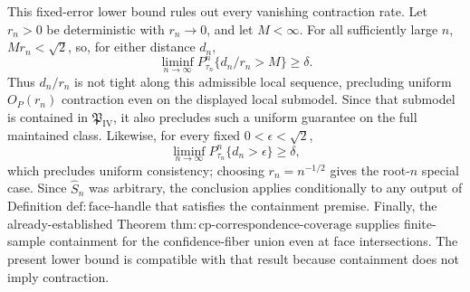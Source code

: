 This fixed-error lower bound rules out every vanishing contraction rate.  Let \(r_n>0\) be deterministic with \(r_n\to0\), and let \(M<\infty\).  For all sufficiently large \(n\), \(Mr_n<\sqrt2\), so, for either distance \(d_n\),
\[
 \liminf_{n\to\infty}P_{\tau_n}^n\{d_n/r_n>M\}\geq\delta.
\]
Thus \(d_n/r_n\) is not tight along this admissible local sequence, precluding uniform \(O_P(r_n)\) contraction even on the displayed local submodel.  Since that submodel is contained in \(\mathfrak P_{\mathrm{IV}}\), it also precludes such a uniform guarantee on the full maintained class.  Likewise, for every fixed \(0<\epsilon<\sqrt2\),
\[
 \liminf_{n\to\infty}P_{\tau_n}^n\{d_n>\epsilon\}\geq\delta,
\]
which precludes uniform consistency; choosing \(r_n=n^{-1/2}\) gives the root-\(n\) special case.  Since \(\widehat S_n\) was arbitrary, the conclusion applies conditionally to any output of Definition \(\mathrm{def{:}face\text{-}handle}\) that satisfies the containment premise.  Finally, the already-established Theorem \(\mathrm{thm{:}cp\text{-}correspondence\text{-}coverage}\) supplies finite-sample containment for the confidence-fiber union even at face intersections.  The present lower bound is compatible with that result because containment does not imply contraction.
